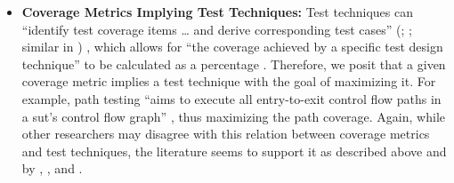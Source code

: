 \begin{itemize}
    \item {}\label{cov-test}
          \textbf{Coverage Metrics Implying Test Techniques:}
          Test techniques can ``identify test coverage items \dots{} and
          derive corresponding test cases'' (\citealp[p.~11]{IEEE2022};
          \citeyear[p.~5]{IEEE2021a}; similar in \citeyear[p.~467]{IEEE2017})%
          , which allows for ``the coverage achieved by a specific test design
          technique'' to be calculated as a percentage %
          \citeyearpar[p.~30]{IEEE2021c}. %
          Therefore, we posit that a given coverage metric implies a test
          technique with the goal of maximizing it. For example, path testing
          ``aims to execute all entry-to-exit control flow paths in a
          \acs{sut}'s control flow graph'' \citep[p.~5\=/13]{SWEBOK2025},
          thus maximizing the path coverage. Again, while other
          researchers may disagree with this relation between coverage
          metrics and test techniques, the literature seems to support it
          as described above and by
          \citet[pp.~183\==185]{DoğanEtAl2014},
          \citet[Fig.~1]{SharmaEtAl2021}, and \citet[pp.~2\==3]{Reid1996}%
          .
\end{itemize}

\clearpage
